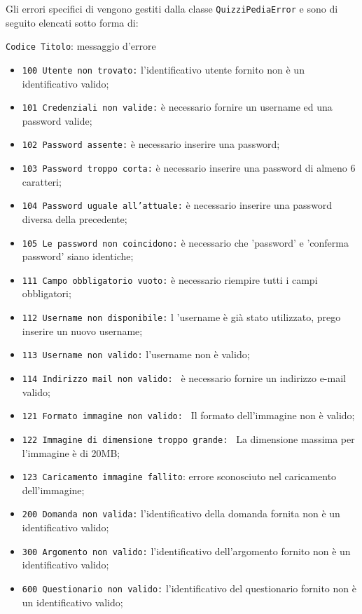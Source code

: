 Gli errori specifici di \textit{\progetto} vengono gestiti dalla classe \texttt{QuizziPediaError} e sono di seguito elencati sotto forma di:
\begin{center}
	\texttt{Codice Titolo}: messaggio d'errore
\end{center}
\begin{itemize}
	\item \texttt{100 Utente non trovato:} l'identificativo utente fornito non è un identificativo valido;
	\item \texttt{101 Credenziali non valide:} è necessario fornire un username ed una password valide;
	\item \texttt{102 Password assente:} è necessario inserire una password;
	\item \texttt{103 Password troppo corta:} è necessario inserire una password di almeno 6 caratteri;
	\item \texttt{104 Password uguale all'attuale:} è necessario inserire una password diversa della precedente;
	\item \texttt{105 Le password non coincidono:} è necessario che 'password' e 'conferma password' siano identiche;
	\item \texttt{111 Campo obbligatorio vuoto:} è necessario riempire tutti i campi obbligatori;
	\item \texttt{112 Username non disponibile:} l 'username è già stato utilizzato, prego inserire un nuovo username;
	\item \texttt{113 Username non valido:} l'username non è valido;
	\item \texttt{114 Indirizzo mail non valido: } è necessario fornire un indirizzo e-mail valido;
	\item \texttt{121 Formato immagine non valido: } Il formato dell'immagine non è valido;
	\item \texttt{122 Immagine di dimensione troppo grande: } La dimensione massima per l'immagine è di 20MB;
	\item \texttt{123 Caricamento immagine fallito}: errore sconosciuto nel caricamento dell'immagine;
	\item \texttt{200 Domanda non valida:} l'identificativo della domanda fornita non è un identificativo valido;
	\item \texttt{300 Argomento non valido:} l'identificativo dell'argomento fornito non è un identificativo valido;
	\item \texttt{600 Questionario non valido:}  l'identificativo del questionario fornito non è un identificativo valido;

\end{itemize}
